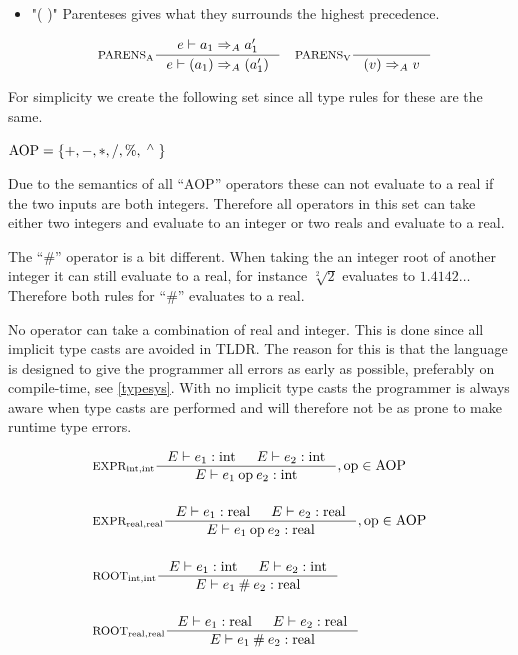 \begin{itemize}
\item "( )" Parenteses gives what they surrounds the highest precedence.

\begin{align*}
&\inference[$\text{PARENS}_\text{A}$]{e \vdash a_1 \Rightarrow_A a_1'}
                       {e \vdash (a_1) \Rightarrow_A (a_1')}
&
&\inference[$\text{PARENS}_\text{V}$]{}
                       {(v) \Rightarrow_A v}
\end{align*}
\end{itemize}

For simplicity we create the following set since all type rules for these are the same.

\begin{center}
$\text{AOP} = \left\{ {+, -, *, /, \%, \; ^\wedge{} \;} \right\}$
\end{center}

Due to the semantics of all \enquote{AOP} operators these can not evaluate to a real if the two inputs are both integers. Therefore all operators in this set can take either two integers and evaluate to an integer or two reals and evaluate to a real.

The \enquote{\#} operator is a bit different. When taking the an integer root of another integer it can still evaluate to a real, for instance $\sqrt[2]{2}$ evaluates to $1.4142\dots$ Therefore both rules for \enquote{\#} evaluates to a real.

No operator can take a combination of real and integer. This is done since all implicit type casts are avoided in TLDR. The reason for this is that the language is designed to give the programmer all errors as early as possible, preferably on compile-time, see \cref{typesys}. With no implicit type casts the programmer is always aware when type casts are performed and will therefore not be as prone to make runtime type errors.

\begin{align*}
&\inference[$\text{EXPR}_{\Tint,\Tint}$]{\Tenv e_1  : \Tint & 
                       \Tenv e_2 : \Tint}
                    {\Tenv e_1 \mathbin{\text{op}} e_2 : \Tint},  \text{op} \in \Taop
\\\\
&\inference[$\text{EXPR}_{\Treal,\Treal}$]{\Tenv e_1 : \Treal & 
                       \Tenv e_2 : \Treal}
                    {\Tenv e_1 \mathbin{\text{op}} e_2 : \Treal},  \text{op} \in \Taop
\\\\
&\inference[$\text{ROOT}_{\Tint,\Tint}$]{\Tenv e_1 : \Tint &
                       \Tenv e_2 : \Tint}
                    {\Tenv e_1 \mathbin{\#} e_2 : \Treal}
\\\\
&\inference[$\text{ROOT}_{\Treal,\Treal}$]{\Tenv e_1 : \Treal &
                       \Tenv e_2 : \Treal}
                    {\Tenv e_1 \mathbin{\#} e_2 : \Treal}
\end{align*}

